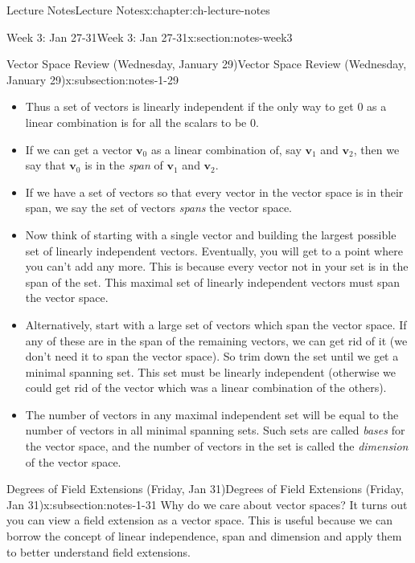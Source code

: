 \documentclass[oneside,11pt,]{book}
\begin{document}
\begin{chapterptx}{Lecture Notes}{}{Lecture Notes}{}{}{x:chapter:ch-lecture-notes}
\begin{sectionptx}{Week 3: Jan 27-31}{}{Week 3: Jan 27-31}{}{}{x:section:notes-week3}
\begin{subsectionptx}{Vector Space Review (Wednesday, January 29)}{}{Vector Space Review (Wednesday, January 29)}{}{}{x:subsection:notes-1-29}
\begin{itemize}[label=\textbullet]
\begin{equation*}
a_1\mathrm{\mathbf v}_1+a_2\mathrm{\mathbf v}_2 + \cdots +a_n\mathrm{\mathbf v}_n = \mathbf 0
\end{equation*}
with not all of \(a_1, a_2, \ldots, a_n\) equal to 0.%
\item{}Thus a set of vectors is linearly independent if the only way to get 0 as a linear combination is for all the scalars to be 0.%
\item{}If we can get a vector \(\mathrm{\mathbf v}_0\) as a linear combination of, say \(\mathrm{\mathbf v}_1\) and \(\mathrm{\mathbf v}_2\), then we say that \(\mathrm{\mathbf v}_0\) is in the \emph{span} of \(\mathrm{\mathbf v}_1\) and \(\mathrm{\mathbf v}_2\).%
\item{}If we have a set of vectors so that every vector in the vector space is in their span, we say the set of vectors \emph{spans} the vector space.%
\item{}Now think of starting with a single vector and building the largest possible set of linearly independent vectors. Eventually, you will get to a point where you can’t add any more. This is because every vector not in your set is in the span of the set. This maximal set of linearly independent vectors must span the vector space.%
\item{}Alternatively, start with a large set of vectors which span the vector space. If any of these are in the span of the remaining vectors, we can get rid of it (we don’t need it to span the vector space). So trim down the set until we get a minimal spanning set. This set must be linearly independent (otherwise we could get rid of the vector which was a linear combination of the others).%
\item{}The number of vectors in any maximal independent set will be equal to the number of vectors in all minimal spanning sets. Such sets are called \emph{bases} for the vector space, and the number of vectors in the set is called the \emph{dimension} of the vector space.%
\end{itemize}
%
\end{subsectionptx}
%
%
\typeout{************************************************}
\typeout{************************************************}
%
\begin{subsectionptx}{Degrees of Field Extensions (Friday, Jan 31)}{}{Degrees of Field Extensions (Friday, Jan 31)}{}{}{x:subsection:notes-1-31}
Why do we care about vector spaces? It turns out you can view a field extension as a vector space. This is useful because we can borrow the concept of linear independence, span and dimension and apply them to better understand field extensions.%

\end{subsectionptx}
\end{sectionptx}
\end{chapterptx}
\end{document}
